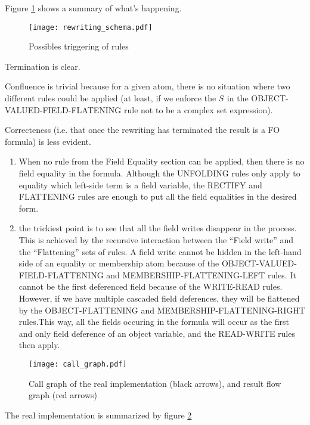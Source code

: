 \documentclass{article}
\newcommand{\sett}[1]{S_{#1}}
\begin{document}
Figure \ref{fig:transitions} shows a summary of what's happening.

\begin{figure}[htb] %
   \centering
   \texttt{[image: rewriting\_schema.pdf]} 
   \caption{Possibles triggering of rules}
   \label{fig:transitions}
\end{figure}

Termination is clear. 

Confluence is trivial because for a given atom, there is no situation where two different rules could be applied (at least, if we enforce the $\sett{}$ in the OBJECT-VALUED-FIELD-FLATENING rule not to be a complex set expression). 

Correcteness (i.e. that once the rewriting has terminated the result is a FO formula) is less evident.

\begin{enumerate}
\item When no rule from the Field Equality section can be applied, then there is no field equality in the formula. Although the UNFOLDING rules only apply to equality which left-side term is a field variable, the RECTIFY and FLATTENING rules are enough to put all the field equalities in the desired form.
\item the trickiest point is to see that all the field writes disappear in the process. This is achieved by the recursive interaction between the ``Field write'' and the ``Flattening'' sets of rules. A field write cannot be hidden in the left-hand side of an equality or membership atom because of the OBJECT-VALUED-FIELD-FLATTENING  and MEMBERSHIP-FLATTENING-LEFT rules. It cannot be the first deferenced field because of the WRITE-READ rules. However, if we have multiple cascaded field deferences, they will be flattened by the OBJECT-FLATTENING and MEMBERSHIP-FLATTENING-RIGHT rules.This way, all the fields occuring in the formula will occur as the first and only field deference of an object variable, and the READ-WRITE rules then apply.
\end{enumerate}


\begin{figure}[htb] %
\centering
   \texttt{[image: call\_graph.pdf]} 
   \caption{Call graph of the real implementation (black arrows), and result flow graph (red arrows)}
   \label{fig:callgraph}
\end{figure}

The real implementation is summarized by figure \ref{fig:callgraph}
\end{document}
